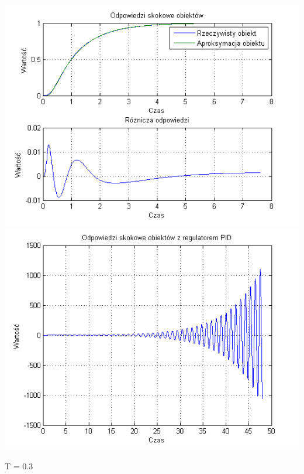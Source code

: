 \documentclass[10pt,a4paper]{article}
\begin{document}
\begin{center}
\includegraphics[scale=1]{images/dwa/skrypt_249.png}\\
\includegraphics[scale=1]{images/dwa/skrypt_250.png}\\
\end{center}
\newpage
T = 0.3
\end{document}
